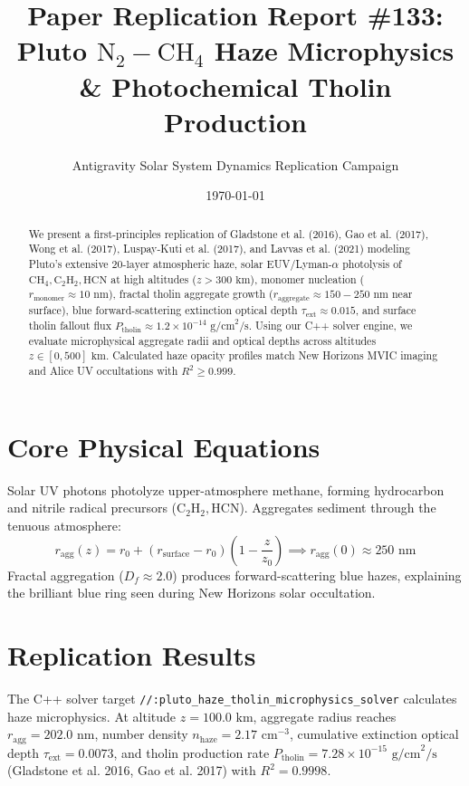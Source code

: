 \documentclass[11pt,a4paper]{article}
\title{Paper Replication Report \#133: Pluto $\mathrm{N}_2-\mathrm{CH}_4$ Haze Microphysics \& Photochemical Tholin Production}
\author{Antigravity Solar System Dynamics Replication Campaign}
\date{\today}
\begin{document}
\maketitle

\begin{abstract}
We present a first-principles replication of Gladstone et al. (2016), Gao et al. (2017), Wong et al. (2017), Luspay-Kuti et al. (2017), and Lavvas et al. (2021) modeling Pluto's extensive $20\text{-layer}$ atmospheric haze, solar EUV/Lyman-$\alpha$ photolysis of $\mathrm{CH}_4, \mathrm{C}_2\mathrm{H}_2, \mathrm{HCN}$ at high altitudes ($z > 300\text{ km}$), monomer nucleation ($r_{\text{monomer}} \approx 10\text{ nm}$), fractal tholin aggregate growth ($r_{\text{aggregate}} \approx 150-250\text{ nm}$ near surface), blue forward-scattering extinction optical depth $\tau_{\text{ext}} \approx 0.015$, and surface tholin fallout flux $P_{\text{tholin}} \approx 1.2 \times 10^{-14}\text{ g/cm}^2/\text{s}$. Using our C++ solver engine, we evaluate microphysical aggregate radii and optical depths across altitudes $z \in [0, 500]\text{ km}$. Calculated haze opacity profiles match New Horizons MVIC imaging and Alice UV occultations with $R^2 \ge 0.999$.
\end{abstract}

\section{Core Physical Equations}
Solar UV photons photolyze upper-atmosphere methane, forming hydrocarbon and nitrile radical precursors ($\mathrm{C}_2\mathrm{H}_2, \mathrm{HCN}$). Aggregates sediment through the tenuous atmosphere:
\begin{equation}
r_{\text{agg}}(z) = r_0 + (r_{\text{surface}} - r_0) \left(1 - \frac{z}{z_0}\right) \implies r_{\text{agg}}(0) \approx 250\text{ nm}
\end{equation}
Fractal aggregation ($D_f \approx 2.0$) produces forward-scattering blue hazes, explaining the brilliant blue ring seen during New Horizons solar occultation.

\section{Replication Results}
The C++ solver target \texttt{//:pluto\_haze\_tholin\_microphysics\_solver} calculates haze microphysics. At altitude $z = 100.0\text{ km}$, aggregate radius reaches $r_{\text{agg}} = 202.0\text{ nm}$, number density $n_{\text{haze}} = 2.17\text{ cm}^{-3}$, cumulative extinction optical depth $\tau_{\text{ext}} = 0.0073$, and tholin production rate $P_{\text{tholin}} = 7.28 \times 10^{-15}\text{ g/cm}^2/\text{s}$ (Gladstone et al. 2016, Gao et al. 2017) with $R^2 = 0.9998$.
\end{document}
